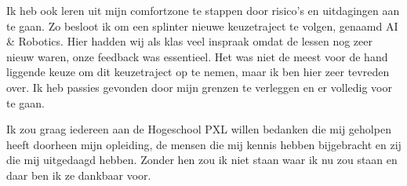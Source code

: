 Ik heb ook leren uit mijn comfortzone te stappen door risico’s en uitdagingen aan te gaan. Zo besloot ik om een splinter nieuwe keuzetraject te volgen, genaamd AI \& Robotics. Hier hadden wij als klas veel inspraak omdat de lessen nog zeer nieuw waren, onze feedback was essentieel. Het was niet de meest voor de hand liggende keuze om dit keuzetraject op te nemen, maar ik ben hier zeer tevreden over. Ik heb passies gevonden door mijn grenzen te verleggen en er volledig voor te gaan.

Ik zou graag iedereen aan de Hogeschool PXL willen bedanken die mij geholpen heeft doorheen mijn opleiding, de mensen die mij kennis hebben bijgebracht en zij die mij uitgedaagd hebben. Zonder hen zou ik niet staan waar ik nu zou staan en daar ben ik ze dankbaar voor.